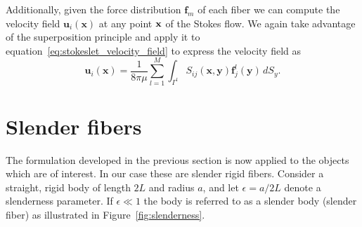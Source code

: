 Additionally, given the force distribution $\mathbf{f}_m$ of each fiber we can compute the velocity field $\mathbf{u}_i(\mathbf{x})$ at any point $\mathbf{x}$ of the Stokes flow. We again take advantage of the superposition principle and apply it to equation~\eqref{eq:stokeslet_velocity_field} to express the velocity field as
\begin{equation}
	\label{eq:objects_velocity_field}
	\mathbf{u}_i(\mathbf{x}) = \frac{1}{8 \pi \mu} \sum_{l=1}^M \int_{\Gamma^l} S_{ij}(\mathbf{x},\mathbf{y})\mathbf{f}_j^l(\mathbf{y}) \, dS_y\text{.}
\end{equation}

\section{Slender fibers}
\label{sec:slender_fibers}

The formulation developed in the previous section is now applied to the objects which are of interest. In our case these are slender rigid fibers. Consider a straight, rigid body of length $2L$ and radius $a$, and let $\epsilon = a / 2 L$ denote a slenderness parameter. If $\epsilon \ll 1$ the body is referred to as a slender body (slender fiber) as illustrated in Figure~\ref{fig:slenderness}.

